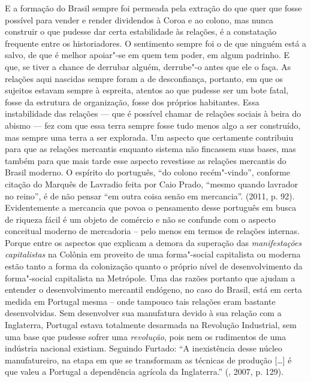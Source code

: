 {E a formação do Brasil sempre foi permeada pela extração do que quer que
fosse possível para vender e render dividendos à Coroa e ao colono, mas
nunca construir o que pudesse dar certa estabilidade às relações, é a
constatação frequente entre os historiadores. O sentimento sempre foi o
de que ninguém está a salvo, de que é melhor apoiar"-se em quem tem
poder, em algum padrinho. E que, se tiver a chance de derrubar alguém,
derrube"-o antes que ele o faça. As relações aqui nascidas sempre foram a
de desconfiança, portanto, em que os sujeitos estavam sempre à espreita,
atentos ao que pudesse ser um bote fatal, fosse da estrutura de
organização, fosse dos próprios habitantes. Essa instabilidade das
relações --- que é possível chamar de relações sociais à beira do
abismo --- fez com que essa terra sempre fosse tudo menos algo a ser
construído, mas sempre uma terra a ser explorada. Um aspecto que
certamente contribuiu para que as relações mercantis enquanto sistema
não fincassem suas bases, mas também para que mais tarde esse aspecto revestisse
as relações mercantis do Brasil moderno. O espírito do português, ``do colono
recém"-vindo'', conforme citação do Marquês de Lavradio feita por Caio
Prado, ``mesmo quando lavrador no reino'', é de não pensar ``em outra
coisa senão em mercancia''. (2011, p. 92). Evidentemente a mercancia que
povoa o pensamento desse português em busca de riqueza fácil é um objeto
de comércio e não se confunde com o aspecto conceitual moderno de
mercadoria -- pelo menos em termos de relações internas. Porque entre os
aspectos que explicam a demora da superação das \emph{manifestações
capitalistas} na Colônia em proveito de uma forma"-social capitalista ou
moderna estão tanto a forma da colonização quanto o próprio nível de
desenvolvimento da forma"-social capitalista na Metrópole. Uma das razões
portanto que ajudam a entender o desenvolvimento mercantil endógeno, no
caso do Brasil, está em certa medida em Portugal mesma -- onde tampouco
tais relações eram bastante desenvolvidas. Sem desenvolver sua
manufatura devido à sua relação com a Inglaterra, Portugal estava
totalmente desarmada na Revolução Industrial, sem uma base que pudesse
sofrer uma \emph{revolução}, pois nem os rudimentos de uma indústria
nacional existiam. Seguindo Furtado: ``A inexistência desse núcleo
manufatureiro, na etapa em que se transformam as técnicas de produção
[\ldots{}] é que valeu a Portugal a dependência agrícola da Inglaterra.''
(, 2007, p. 129).

}
